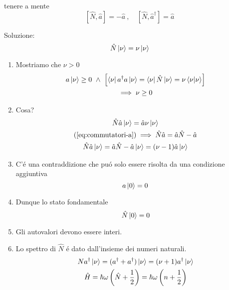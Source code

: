 \begin{multicols}{3}
  tenere a mente
  \begin{equation}
    \label{eq:commutatori-a}
    \left[\hat{N}, \hat{a}\right] = -\hat{a}
    ~, \quad
    \left[\hat{N}, \hat{a}^{\dagger}\right] = \hat{a}
  \end{equation}

  Soluzione:
  \begin{equation}
    \hat{N}\ket{\nu} = \nu\ket{\nu}
  \end{equation}

  \begin{enumerate}
  \item Mostriamo che $\nu > 0$
    \begin{equation}
      \begin{gathered}
        a\ket{\nu} \geq 0
        ~\wedge~
        \left[\bra{\nu}a^{\dagger}a\ket{\nu}
        = \bra{\nu}\hat{N}\ket{\nu} = \nu\bra{\nu}\ket{\nu}\right] \\
        \implies \nu \geq 0
      \end{gathered}
    \end{equation}

  \item Cosa?
    \begin{equation}
      \begin{gathered}
        \hat{N} \hat{a} \ket{\nu} = \hat{a}\nu\ket{\nu} \\
        (\ref{eq:commutatori-a}) \implies \hat{N}\hat{a} = \hat{a}\hat{N} - \hat{a} \\
        \hat{N}\hat{a}\ket{\nu} = \hat{a}\hat{N} - \hat{a}\ket{\nu} = (\nu - 1) \hat{a}\ket{\nu}
      \end{gathered}
    \end{equation}

  \item C'\'e una contraddizione che pu\'o solo essere risolta da una condizione aggiuntiva
    \begin{equation}
      a\ket{0} = 0
    \end{equation}

  \item Dunque lo stato fondamentale
    \begin{equation}
      \hat{N}\ket{0} = 0
    \end{equation}

  \item Gli autovalori devono essere interi.

  \item Lo spettro di $\hat{N}$ \'e dato dall'insieme dei numeri naturali.
    \begin{equation}
      \begin{gathered}
        Na^\dagger\ket{\nu} = (a^\dagger + a^\dagger)\ket{\nu} = (\nu + 1)a^\dagger\ket{\nu} \\
        \hat{H} = \hbar\omega\left(\hat{N}+\frac{1}{2}\right) = \hbar\omega\left(n+\frac{1}{2}\right)
      \end{gathered}
    \end{equation}
  \end{enumerate}


\end{multicols}
